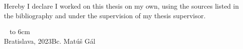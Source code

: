 \documentclass[12pt, a4paper, oneside]{book}
\numberwithin{definition}{chapter}
\numberwithin{theorem}{chapter}
\newcommand\mfauthor{Bc. Matúš Gál}
\newcommand\mfplacedate{Bratislava, 2023}
\begin{document}
\begin{figure}[H]
\begin{center}
\label{img:zadanie}
\end{center}
\end{figure}

{~}\vspace{12cm}

\noindent
\begin{minipage}{0.25\textwidth}~\end{minipage}
\begin{minipage}{0.75\textwidth}
Hereby I declare I worked on this thesis on my own, using the sources listed in the bibliography and under the supervision of my thesis supervisor.
\newline \newline
\end{minipage}
\vfill
~ \hfill {\hbox to 6cm{\dotfill}} \\
\mfplacedate \hfill \mfauthor
\vfill\eject
\end{document}
